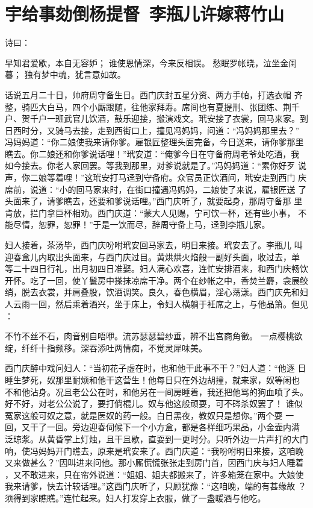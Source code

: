 \chapter{宇给事劾倒杨提督~李瓶儿许嫁蒋竹山}

诗曰：

早知君爱歇，本自无容妒；
谁使恩情深，今来反相误。
愁眠罗帐晓，泣坐金闺暮；
独有梦中魂，犹言意如故。

话说五月二十日，帅府周守备生日。西门庆封五星分资、两方手帕，打选衣帽
齐整，骑匹大白马，四个小厮跟随，往他家拜寿。席间也有夏提刑、张团练、荆千
户、贺千户一班武官儿饮酒，鼓乐迎接，搬演戏文。玳安接了衣裳，回马来家。到
日西时分，又骑马去接，走到西街口上，撞见冯妈妈，问道：“冯妈妈那里去？”
冯妈妈道：“你二娘使我来请你爹。雇银匠整理头面完备，今日送来，请你爹那里
瞧去。你二娘还和你爹说话哩！”玳安道：“俺爹今日在守备府周老爷处吃酒，我
如今接去。你老人家回罢。等我到那里，对爹说就是了。”冯妈妈道：“累你好歹
说声，你二娘等着哩！”这玳安打马迳到守备府。众官员正饮酒间，玳安走到西门
庆席前，说道：“小的回马家来时，在街口撞遇冯妈妈，二娘使了来说，雇银匠送
了头面来了，请爹瞧去，还要和爹说话哩。”西门庆听了，就要起身，那周守备那
里肯放，拦门拿巨杯相劝。西门庆道：“蒙大人见赐，宁可饮一杯，还有些小事，
不能尽情，恕罪，恕罪！”于是一饮而尽，辞周守备上马，迳到李瓶儿家。

妇人接着，茶汤毕，西门庆吩咐玳安回马家去，明日来接。玳安去了。李瓶儿
叫迎春盒儿内取出头面来，与西门庆过目。黄烘烘火焰般一副好头面，收过去，单
等二十四日行礼，出月初四日准娶。妇人满心欢喜，连忙安排酒来，和西门庆畅饮
开怀。吃了一回，使丫鬟房中搽抹凉席干净。两个在纱帐之中，香焚兰麝，衾展鲛
绡，脱去衣裳，并肩叠股，饮酒调笑。良久，春色横眉，淫心荡漾。西门庆先和妇
人云雨一回，然后乘着酒兴，坐于床上，令妇人横躺于衽席之上，与他品箫。但见
：

不竹不丝不石，肉音别自唔咿。流苏瑟瑟碧纱垂，辨不出宫商角徵。
一点樱桃欲绽，纤纤十指频移。深吞添吐两情痴，不觉灵犀味美。

西门庆醉中戏问妇人：“当初花子虚在时，也和他干此事不干？”妇人道：“他逐
日睡生梦死，奴那里耐烦和他干这营生！他每日只在外边胡撞，就来家，奴等闲也
不和他沾身。况且老公公在时，和他另在一间房睡着，我还把他骂的狗血喷了头。
好不好，对老公公说了，要打倘棍儿。奴与他这般顽耍，可不硶杀奴罢了！
谁似冤家这般可奴之意，就是医奴的药一般。白日黑夜，教奴只是想你。”两个耍
一回，又干了一回。旁边迎春伺候下一个小方盒，都是各样细巧果品，小金壶内满
泛琼浆。从黄昏掌上灯烛，且干且歇，直耍到一更时分。只听外边一片声打的大门
响，使冯妈妈开门瞧去，原来是玳安来了。西门庆道：“我吩咐明日来接，这咱晚
又来做甚么？”因叫进来问他。那小厮慌慌张张走到房门首，因西门庆与妇人睡着
，又不敢进来，只在帘外说道：“姐姐、姐夫都搬来了，许多箱笼在家中。大娘使
我来请爹，快去计较话哩。”这西门庆听了，只顾犹豫：“这咱晚，端的有甚缘故
？须得到家瞧瞧。”连忙起来。妇人打发穿上衣服，做了一盏暖酒与他吃。

